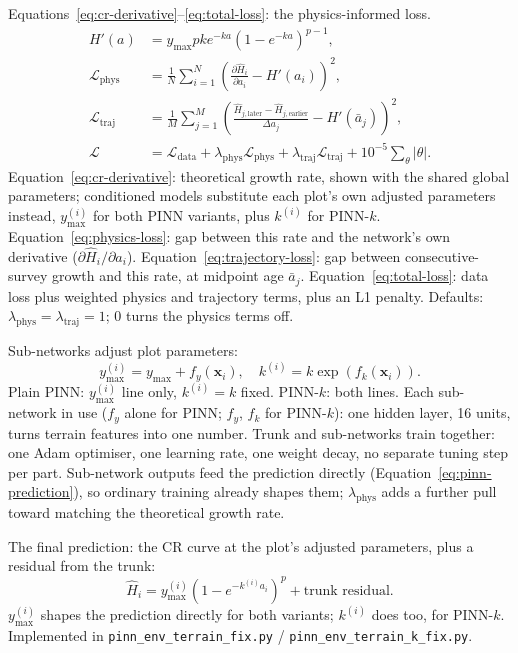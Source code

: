 \documentclass[logo,msc,ai]{infthesis}           %
\begin{document}
Equations~\eqref{eq:cr-derivative}--\eqref{eq:total-loss}: the physics-informed loss.
\begin{align}
H'(a) &= y_{\max}pk e^{-ka}\left(1-e^{-ka}\right)^{p-1}, \label{eq:cr-derivative} \\
\mathcal{L}_{\mathrm{phys}} &= \frac{1}{N}\sum_{i=1}^{N}\left(\frac{\partial\hat H_i}{\partial a_i}-H'(a_i)\right)^2, \label{eq:physics-loss} \\
\mathcal{L}_{\mathrm{traj}} &= \frac{1}{M}\sum_{j=1}^{M}\left(\frac{\hat H_{j,\mathrm{later}}-\hat H_{j,\mathrm{earlier}}}{\Delta a_j}-H'(\bar a_j)\right)^2, \label{eq:trajectory-loss} \\
\mathcal{L} &= \mathcal{L}_{\mathrm{data}} + \lambda_{\mathrm{phys}}\mathcal{L}_{\mathrm{phys}} + \lambda_{\mathrm{traj}}\mathcal{L}_{\mathrm{traj}} + 10^{-5}\sum_{\theta}|\theta|. \label{eq:total-loss}
\end{align}
Equation~\eqref{eq:cr-derivative}: theoretical growth rate, shown with the shared global parameters; conditioned models substitute each plot's own adjusted parameters instead, $y_{\max}^{(i)}$ for both PINN variants, plus $k^{(i)}$ for PINN-$k$. Equation~\eqref{eq:physics-loss}: gap between this rate and the network's own derivative ($\partial\hat H_i/\partial a_i$). Equation~\eqref{eq:trajectory-loss}: gap between consecutive-survey growth and this rate, at midpoint age $\bar a_j$. Equation~\eqref{eq:total-loss}: data loss plus weighted physics and trajectory terms, plus an L1 penalty. Defaults: $\lambda_{\mathrm{phys}}=\lambda_{\mathrm{traj}}=1$; 0 turns the physics terms off.

Sub-networks adjust plot parameters:
\begin{equation}
y_{\max}^{(i)} = y_{\max}+f_y(\mathbf{x}_i), \quad k^{(i)} = k\exp\!\left(f_k(\mathbf{x}_i)\right).
\label{eq:param-adjust}
\end{equation}
Plain PINN: $y_{\max}^{(i)}$ line only, $k^{(i)}=k$ fixed. PINN-$k$: both lines. Each sub-network in use ($f_y$ alone for PINN; $f_y$, $f_k$ for PINN-$k$): one hidden layer, 16 units, turns terrain features into one number. Trunk and sub-networks train together: one Adam optimiser, one learning rate, one weight decay, no separate tuning step per part. Sub-network outputs feed the prediction directly (Equation~\eqref{eq:pinn-prediction}), so ordinary training already shapes them; $\lambda_{\mathrm{phys}}$ adds a further pull toward matching the theoretical growth rate.

The final prediction: the CR curve at the plot's adjusted parameters, plus a residual from the trunk:
\begin{equation}
\hat H_i = y_{\max}^{(i)}\left(1-e^{-k^{(i)}a_i}\right)^{p} + \text{trunk residual}.
\label{eq:pinn-prediction}
\end{equation}
$y_{\max}^{(i)}$ shapes the prediction directly for both variants; $k^{(i)}$ does too, for PINN-$k$. Implemented in \texttt{pinn\_env\_terrain\_fix.py} / \texttt{pinn\_env\_terrain\_k\_fix.py}.
\end{document}
